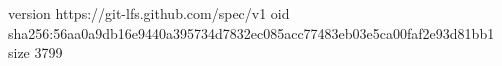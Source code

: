 version https://git-lfs.github.com/spec/v1
oid sha256:56aa0a9db16e9440a395734d7832ec085acc77483eb03e5ca00faf2e93d81bb1
size 3799
